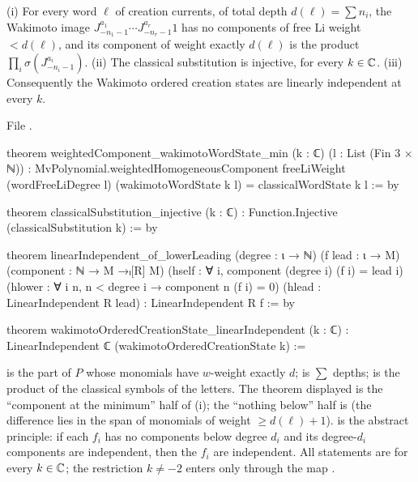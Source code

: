 \begin{theorem}\label{l08:thm:leading}
(i) For every word $\ell$ of creation currents, of total depth $d(\ell)=\sum n_i$, the Wakimoto image
$J^{a_1}_{-n_1-1}\cdots J^{a_r}_{-n_r-1}1$ has no components of free Li weight $<d(\ell)$, and its
component of weight exactly $d(\ell)$ is the product $\prod_i\sigma(J^{a_i}_{-n_i-1})$.
(ii) The classical substitution is injective, for every $k\in{\mathbb{C}}$.
(iii) Consequently the Wakimoto ordered creation states are linearly independent at every $k$.
\end{theorem}

\noindent File .
\begin{leancode}
theorem weightedComponent_wakimotoWordState_min (k : ℂ) (l : List (Fin 3 × ℕ)) :
    MvPolynomial.weightedHomogeneousComponent freeLiWeight (wordFreeLiDegree l)
        (wakimotoWordState k l) =
      classicalWordState k l := by

theorem classicalSubstitution_injective (k : ℂ) :
    Function.Injective (classicalSubstitution k) := by

theorem linearIndependent_of_lowerLeading (degree : ι → ℕ) (f lead : ι → M)
    (component : ℕ → M →ₗ[R] M)
    (hself : ∀ i, component (degree i) (f i) = lead i)
    (hlower : ∀ i n, n < degree i → component n (f i) = 0)
    (hlead : LinearIndependent R lead) : LinearIndependent R f := by

theorem wakimotoOrderedCreationState_linearIndependent (k : ℂ) :
    LinearIndependent ℂ (wakimotoOrderedCreationState k) :=
\end{leancode}

\begin{dictionary}
 is the part of $P$ whose monomials have $w$-weight exactly
$d$;  is $\sum$ depths;  is the product of the
classical symbols of the letters. The theorem displayed is the ``component at the minimum'' half of
(i); the ``nothing below'' half is \allowbreak{}\allowbreak{}\allowbreak{}\allowbreak{} (the
difference lies in the span of monomials of weight $\ge d(\ell)+1$). \allowbreak{}\allowbreak{}
is the abstract principle: if each $f_i$ has no components below degree $d_i$ and its degree-$d_i$
components are independent, then the $f_i$ are independent. All statements are for every $k\in{\mathbb{C}}$;
the restriction $k\ne-2$ enters only through the map .
\end{dictionary}

